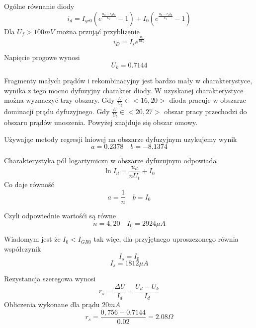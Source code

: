 \documentclass[11pt]{article}
\begin{document}
Ogólne równanie diody
$$ i_d = I_{gr0}(e^{\frac{u_d - r_di_d}{U_t}} - 1) + I_0(e^{\frac{u_d - r_di_d}{U_t}} -1) $$
Dla $ U_f > 100mV$ można przująć przybliżenie
$$ i_D = I_se^\frac{u_d}{nU_t} $$

Napięcie progowe wynosi
$$ U_k =  0.7144 $$

Fragmenty małych prądów i rekombinacyjny jest bardzo mały w charakterystyce, wynika z tego mocno dyfuzyjny charakter diody.
W uzyskanej charakterystyce można wyznaczyć trzy obszary. Gdy $\frac{U}{U_t} \in <16,20>$ dioda pracuje w obszarze dominacji prądu dyfuzyjnego. Gdy $\frac{U}{U_t} \in <20,27>$ obszar pracy przechodzi do obszaru prądów unoszenia. Powyżej znajduje się obszar omowy.

Używając metody regresji lniowej na obszarze dyfuzyjnym uzykujemy wynik
$$ a =  0.2378 \quad b = -8.1374 $$

Charakterystyka pół logartymiczn w obszarze dyfuzujnym odpowiada
$$ \ln{I_d} = \frac{u_d}{nU_t} + I_0$$
Co daje równość
$$ a = \frac{1}{n} \quad b = I_0 $$

Czyli odpowiednie wartośći są równe
$$ n = 4,20 \quad I_0 = 2924 \mu A $$

Wiadomym jest że $ I_0 < I_{GR0} $ tak więc, dla przyjętnego uproszczonego równia współczynik 
$$ I_s = I_0 $$
$$ I_s = 1812 \mu A $$

Rezystancja szeregowa wynosi
$$ r_s = \frac{\Delta U}{I_d} = \frac{U_d - U_k}{I_d} $$
Obliczenia wykonane dla prądu $20mA$
$$ r_s = \frac{0,756-0.7144}{0.02} = 2.08 \Omega $$
\end{document}
